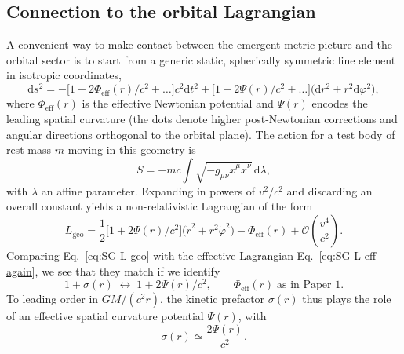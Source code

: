 \documentclass[11pt]{article}
\begin{document}
\subsection{Connection to the orbital Lagrangian}
\label{subsec:lagrangian-connection}

A convenient way to make contact between the emergent metric picture and
the orbital sector is to start from a generic static, spherically symmetric
line element in isotropic coordinates,
\begin{equation}
  \mathrm{d}s^2
  = -\bigl[1 + 2\Phi_{\text{eff}}(r)/c^2 + \dots\bigr] c^2 \mathrm{d}t^2
    + \bigl[1 + 2\Psi(r)/c^2 + \dots\bigr]
      \bigl(\mathrm{d}r^2 + r^2 \mathrm{d}\varphi^2\bigr),
  \label{eq:SG-metric-PN}
\end{equation}
where $\Phi_{\text{eff}}(r)$ is the effective Newtonian potential and
$\Psi(r)$ encodes the leading spatial curvature (the dots denote higher
post-Newtonian corrections and angular directions orthogonal to the orbital
plane).
The action for a test body of rest mass $m$ moving in this geometry is
\begin{equation}
  S = -m c \int \sqrt{-g_{\mu\nu} \dot{x}^\mu \dot{x}^\nu}\,\mathrm{d}\lambda,
\end{equation}
with $\lambda$ an affine parameter.
Expanding in powers of $v^2/c^2$ and discarding an overall constant yields a
non-relativistic Lagrangian of the form
\begin{equation}
  L_{\text{geo}}
  = \frac{1}{2}\bigl[1 + 2\Psi(r)/c^2\bigr]
      \bigl(\dot r^2 + r^2 \dot\varphi^2\bigr)
    - \Phi_{\text{eff}}(r)
    + \mathcal{O}\!\left(\frac{v^4}{c^2}\right).
  \label{eq:SG-L-geo}
\end{equation}
Comparing Eq.~\eqref{eq:SG-L-geo} with the effective Lagrangian
Eq.~\eqref{eq:SG-L-eff-again}, we see that they match if we identify
\begin{equation}
  1 + \sigma(r)
  \;\longleftrightarrow\;
  1 + 2\Psi(r)/c^2,
  \qquad
  \Phi_{\text{eff}}(r)
  \;\text{as in Paper~1}.
\end{equation}
To leading order in $GM/(c^2 r)$, the kinetic prefactor $\sigma(r)$ thus
plays the role of an effective spatial curvature potential
$\Psi(r)$, with
\begin{equation}
  \sigma(r)
  \simeq \frac{2\Psi(r)}{c^2}.
\end{equation}
\end{document}
